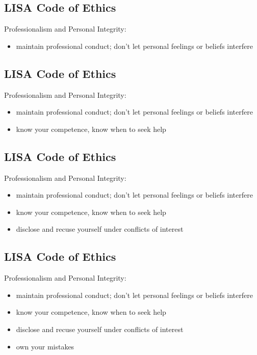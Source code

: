 \documentclass[xga]{xdvislides}
\begin{document}
\subsection{LISA Code of Ethics}
Professionalism and Personal Integrity:

\begin{itemize}
	\item maintain professional conduct; don't let
personal feelings or beliefs interfere
\end{itemize}

\subsection{LISA Code of Ethics}
Professionalism and Personal Integrity:

\begin{itemize}
	\item maintain professional conduct; don't let
personal feelings or beliefs interfere
	\item know your competence, know when to seek help
\end{itemize}

\subsection{LISA Code of Ethics}
Professionalism and Personal Integrity:

\begin{itemize}
	\item maintain professional conduct; don't let
personal feelings or beliefs interfere
	\item know your competence, know when to seek help
	\item disclose and recuse yourself under conflicts of interest
\end{itemize}

\subsection{LISA Code of Ethics}
Professionalism and Personal Integrity:

\begin{itemize}
	\item maintain professional conduct; don't let
personal feelings or beliefs interfere
	\item know your competence, know when to seek help
	\item disclose and recuse yourself under conflicts of interest
	\item own your mistakes
\end{itemize}
\end{document}
